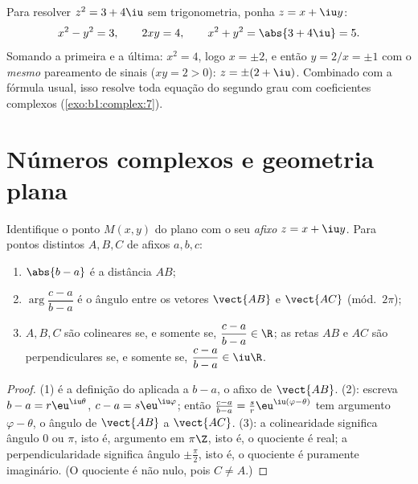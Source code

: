 \begin{example}\label{ex:b1:complex:sqrt}
Para resolver $z^2 = 3 + 4\iu$ sem trigonometria, ponha $z = x + \iu y$:
\[
x^2 - y^2 = 3, \qquad 2xy = 4, \qquad x^2 + y^2 = \abs{3 + 4\iu} = 5 .
\]
Somando a primeira e a última: $x^2 = 4$, logo $x = \pm 2$, e então $y = 2/x =
\pm 1$ com o \emph{mesmo} pareamento de sinais ($xy = 2 > 0$): $z = \pm(2 +
\iu)$. Combinado com a fórmula usual, isso resolve toda equação do
segundo grau com coeficientes complexos
(\cref{exo:b1:complex:7}).
\end{example}

\section{Números complexos e geometria plana}

\begin{proposition}\label{prop:b1:complex:geometry}
Identifique o ponto $M(x, y)$ do plano com o seu \emph{afixo} $z = x
+ \iu y$. Para pontos distintos $A, B, C$ de afixos $a, b,
c$:
\begin{enumerate}
  \item $\abs{b - a}$ é a distância $AB$;
  \item $\arg\dfrac{c - a}{b - a}$ é o ângulo entre os vetores
        $\vect{AB}$ e $\vect{AC}$ (mód.\ $2\pi$);
  \item $A, B, C$ são colineares se, e somente se, $\dfrac{c - a}{b - a} \in
        \R$; as retas $AB$ e $AC$ são perpendiculares se, e somente se,
        $\dfrac{c - a}{b - a} \in \iu\R$.
\end{enumerate}
\end{proposition}

\begin{proof}
(1) é a definição do  aplicada a $b - a$, o afixo de
$\vect{AB}$. (2): escreva $b - a = r\eu^{\iu\theta}$, $c - a =
s\eu^{\iu\varphi}$; então $\frac{c-a}{b-a} = \frac sr
\eu^{\iu(\varphi - \theta)}$ tem argumento $\varphi - \theta$, o
ângulo de $\vect{AB}$ a $\vect{AC}$. (3): a colinearidade significa ângulo $0$
ou $\pi$, isto é, argumento em $\pi\Z$, isto é, o quociente é real; a
perpendicularidade significa ângulo $\pm\frac\pi2$, isto é, o quociente é
puramente imaginário. (O quociente é não nulo, pois $C \neq A$.)
\end{proof}

